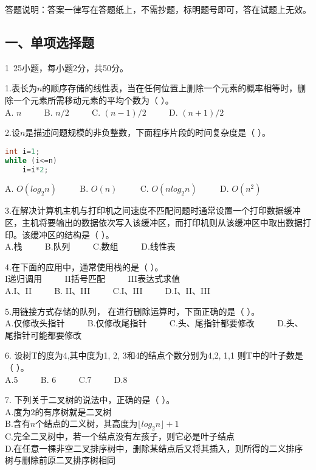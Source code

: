 

答题说明：答案一律写在答题纸上，不需抄题，标明题号即可，答在试题上无效。

\subsection{一、单项选择题}

1~25小题，每小题2分，共50分。

1.表长为$n$的顺序存储的线性表，当在任何位置上删除一个元素的概率相等时，删除一个元素所需移动元素的平均个数为（    ）。 \\
A. $n$ $\qquad$ B. $n/2$ $\qquad$ C. $(n-1)/2$ $\qquad$ D. $(n+1)/2$

2.设$n$是描述问题规模的非负整数，下面程序片段的时间复杂度是（    ）。 \\
\begin{lstlisting}[language=cpp]
int i=1;
while (i<=n)
    i=i*2;
\end{lstlisting}
A. $O(log_2n)$  $\qquad$  B. $O(n)$  $\qquad$  C. $O(nlog_2n)$  $\qquad$  D. $O(n^2)$

3.在解决计算机主机与打印机之间速度不匹配问题时通常设置一个打印数据缓冲区，主机将要输出的数据依次写入该缓冲区，而打印机则从该缓冲区中取出数据打印。该缓冲区的结构是（    ）。 \\
A.栈 $\qquad$ B.队列 $\qquad$ C.数组 $\qquad$ D.线性表

4.在下面的应用中，通常使用栈的是（    ）。 \\
I递归调用 $\qquad$ II括号匹配 $\qquad$ III表达式求值 $\qquad$ \\
A.I、II $\qquad$ B. II、III $\qquad$ C.I、III $\qquad$ D.I、II、III

5.用链接方式存储的队列， 在进行删除运算时，下面正确的是（    ）。 \\
A.仅修改头指针 $\qquad$ B.仅修改尾指针 $\qquad$ C.头、尾指针都要修改 $\qquad$ D.头、尾指针可能都要修改

6. 设树T的度为4,其中度为1, 2, 3和4的结点个数分别为4,2, 1,1 则T中的叶子数是（    ）。 \\
A.5 $\qquad$ B. 6 $\qquad$ C.7 $\qquad$ D.8

7. 下列关于二叉树的说法中，正确的是（    ）。 \\
A.度为$2$的有序树就是二叉树 \\
B.含有$n$个结点的二义树，其高度为$\lfloor log_2n \rfloor +1$ \\
C.完全二叉树中，若一个结点没有左孩子，则它必是叶子结点 \\
D.在任意一棵非空二叉排序树中，删除某结点后又将其插入，则所得的二义排序树与删除前原二叉排序树相同

